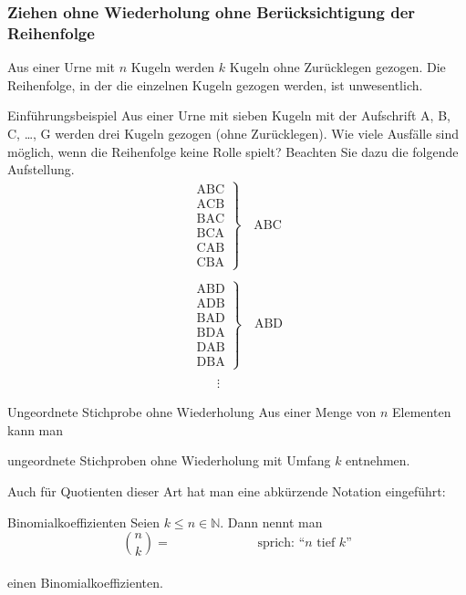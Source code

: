 \subsubsection{Ziehen ohne Wiederholung ohne Berücksichtigung der Reihenfolge}
Aus einer Urne mit \(n\) Kugeln werden \(k\) Kugeln ohne Zurücklegen gezogen. Die Reihenfolge, in der die einzelnen Kugeln gezogen werden, ist unwesentlich.
\begin{bsp}
    {Einführungsbeispiel}{}
    Aus einer Urne mit sieben Kugeln mit der Aufschrift A, B, C, \dots, G werden drei Kugeln gezogen (ohne Zurücklegen). Wie viele Ausfälle sind möglich, wenn die Reihenfolge keine Rolle spielt? Beachten Sie dazu die folgende Aufstellung.
    \[
        \begin{array}{l}
            \left.
            \begin{array}{l}
                \text{ABC} \\
                \text{ACB} \\
                \text{BAC} \\
                \text{BCA} \\
                \text{CAB} \\
                \text{CBA}
            \end{array}
            \right\} \quad \text{ABC} \\\\
            \left.
            \begin{array}{l}
                \text{ABD} \\
                \text{ADB} \\
                \text{BAD} \\
                \text{BDA} \\
                \text{DAB} \\
                \text{DBA}
            \end{array}
            \right\} \quad \text{ABD} \\\\
            \qquad\vdots
        \end{array}
    \]
\end{bsp}

\begin{satz}
    {Ungeordnete Stichprobe ohne Wiederholung}{}
    Aus einer Menge von \(n\) Elementen kann man

    \vspace{2cm}

    ungeordnete Stichproben ohne Wiederholung mit Umfang \(k\) entnehmen.

\end{satz}
Auch für Quotienten dieser Art hat man eine abkürzende Notation eingeführt:
\begin{definition}
    {Binomialkoeffizienten}{}
    Seien \(k \leq n \in \mathbb{N}\). Dann nennt man
    \[
        \binom{n}{k} = \hspace{2cm}  \qquad \text{sprich: ``\(n\) tief \(k\)''}
    \]
    \\
    einen Binomialkoeffizienten.

\end{definition}

